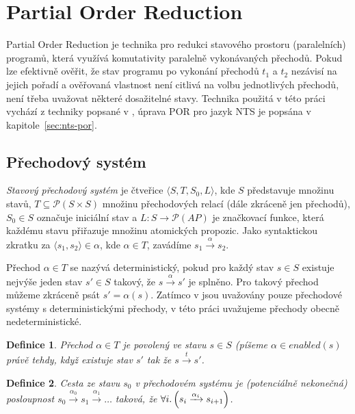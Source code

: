 \documentclass[12pt]{fithesis2}
\newtheorem{definition}{Definice}
\newcommand{\tuple}[1]{\langle #1 \rangle}
\begin{document}
\section{Partial Order Reduction}
\label{sec:POR}
Partial Order Reduction je technika pro redukci stavového prostoru (paralelních) programů, která využívá komutativity paralelně vykonávaných přechodů. Pokud lze efektivně ověřit, že stav programu po vykonání přechodů $t_1$ a $t_2$ nezávisí na jejich pořadí a ověřovaná vlastnost není citlivá na volbu jednotlivých přechodů, není třeba uvažovat některé dosažitelné stavy. Technika použitá v této práci vychází z techniky popsané v \cite{CLARKE}, úprava POR pro jazyk NTS je popsána v kapitole~\ref{sec:nts-por}.

\subsection{Přechodový systém}
\textit{Stavový přechodový systém} je čtveřice $\tuple{S, T, S_0, L}$, kde $S$ představuje množinu stavů, $T \subseteq \mathcal{P}\left({S \times S}\right)$ množinu přechodových relací (dále zkráceně jen přechodů), $S_0 \in S$ označuje iniciální stav a $L : S \rightarrow \mathcal{P}\left({\mathit{AP}}\right)$ je značkovací funkce, která každému stavu přiřazuje množinu atomických propozic. Jako syntaktickou zkratku za $\tuple{s_1, s_2} \in \alpha$, kde $\alpha \in T$, zavádíme $s_1 \xrightarrow{\alpha} s_2$.

Přechod $\alpha \in T$ se nazývá deterministický, pokud pro každý stav $s \in S$ existuje nejvýše jeden stav $s' \in S$ takový, že $s \xrightarrow{\alpha} s'$ je splněno. Pro takový přechod můžeme zkráceně psát $s' = \alpha(s)$. Zatímco v \cite{CLARKE} jsou uvažovány pouze přechodové systémy s deterministickými přechody, v této práci uvažujeme přechody obecně nedeterministické.


\begin{definition}
Přechod $\alpha \in T$ je povolený ve stavu $s \in S$ (píšeme $\alpha \in \mathit{enabled}(s)$ právě tehdy, když existuje stav $s'$ tak že $s \xrightarrow{t} s'$.
\end{definition}

\begin{definition}
Cesta ze stavu $s_0$ v přechodovém systému je (potenciálně nekonečná) posloupnost $s_0 \xrightarrow{\alpha_0} s_1 \xrightarrow{\alpha_1} \ldots $ taková, že $\forall i \ldotp \left({ s_i \xrightarrow{\alpha_i} s_{i+1} }\right)$.
\end{definition}
\end{document}
